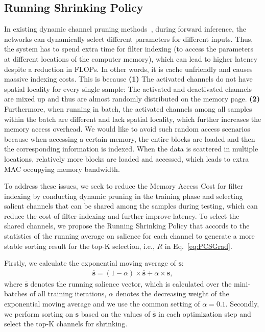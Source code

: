 \documentclass[lettersize,journal]{IEEEtran}
\begin{document}
\subsection{Running Shrinking Policy}
\label{Sec: Running Shrinking Policy}
In existing dynamic channel pruning methods~\cite{dong2017more,gao2018dynamic,hua2018channel,tang2021manifold,su2020dynamic}, during forward inference, the networks can dynamically select different parameters for different inputs.
Thus, the system has to spend extra time for filter indexing (to access the parameters at different locations of the computer memory), which can lead to higher latency despite a reduction in FLOPs. 
In other words, it is cache unfriendly and causes massive indexing costs. This is because \textbf{(1)} The activated channels do not have spatial locality for every single sample: The activated and deactivated channels are mixed up and thus are almost randomly distributed on the memory page. \textbf{(2)} Furthermore, when running in batch, the activated channels among all samples within the batch are different and lack spatial locality, which further increases the memory access overhead. We would like to avoid such random access scenarios because when accessing a certain memory, the entire blocks are loaded and then the corresponding information is indexed. When the data is scattered in multiple locations, relatively more blocks are loaded and accessed,
which leads to extra MAC occupying memory bandwidth.



To address these issues, we seek to reduce the Memory Access Cost for filter indexing by conducting dynamic pruning in the training phase and selecting salient channels that can be shared among the samples during testing, which can reduce the cost of filter indexing and further improve latency.
To select the shared channels, we propose the Running Shrinking Policy that accords to the statistics of the running average on salience for each channel to generate a more stable sorting result for the top-K selection, i.e., $R$ in Eq.~\eqref{eq:PCSGrad}. 


Firstly, we calculate the exponential moving average of $\boldsymbol{s}$: 
\begin{align}
\overline{\boldsymbol{s}}=(1-\alpha)\times \overline{\boldsymbol{s}} +\alpha\times \boldsymbol{s}, 
\end{align}
where $\overline{\boldsymbol{s}}$ denotes the running salience vector, which is calculated over the mini-batches of all training iterations, $\alpha$ denotes the decreasing weight
of the exponential moving average and we use the common setting of $\alpha=0.1$. 
Secondly, we perform sorting on $\boldsymbol{s}$ based on the values of $\overline{\boldsymbol{s}}$ in each optimization step and select the top-K channels for shrinking. 
\end{document}
